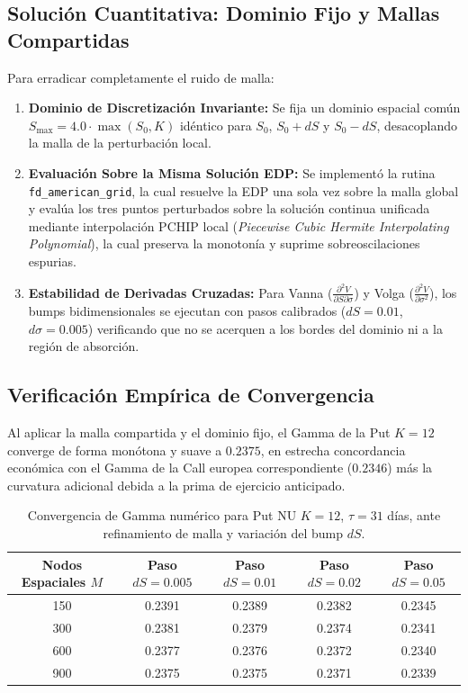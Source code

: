 \documentclass[11pt,a4paper]{article}
\begin{document}
\subsection{Solución Cuantitativa: Dominio Fijo y Mallas Compartidas}
Para erradicar completamente el ruido de malla:
\begin{enumerate}
    \item \textbf{Dominio de Discretización Invariante:} Se fija un dominio espacial común $S_{\max} = 4.0 \cdot \max(S_0, K)$ idéntico para $S_0$, $S_0 + dS$ y $S_0 - dS$, desacoplando la malla de la perturbación local.
    \item \textbf{Evaluación Sobre la Misma Solución EDP:} Se implementó la rutina \texttt{fd\_american\_grid}, la cual resuelve la EDP una sola vez sobre la malla global y evalúa los tres puntos perturbados sobre la solución continua unificada mediante interpolación PCHIP local (\textit{Piecewise Cubic Hermite Interpolating Polynomial}), la cual preserva la monotonía y suprime sobreoscilaciones espurias.
    \item \textbf{Estabilidad de Derivadas Cruzadas:} Para Vanna ($\frac{\partial^2 V}{\partial S \partial \sigma}$) y Volga ($\frac{\partial^2 V}{\partial \sigma^2}$), los bumps bidimensionales se ejecutan con pasos calibrados ($dS = 0.01$, $d\sigma = 0.005$) verificando que no se acerquen a los bordes del dominio ni a la región de absorción.
\end{enumerate}

\subsection{Verificación Empírica de Convergencia}
Al aplicar la malla compartida y el dominio fijo, el Gamma de la Put $K=12$ converge de forma monótona y suave a $0.2375$, en estrecha concordancia económica con el Gamma de la Call europea correspondiente ($0.2346$) más la curvatura adicional debida a la prima de ejercicio anticipado.
\begin{table}[htbp]
\centering
\begin{tabular}{ccccc}
\toprule
\textbf{Nodos Espaciales $M$} & \textbf{Paso $dS = 0.005$} & \textbf{Paso $dS = 0.01$} & \textbf{Paso $dS = 0.02$} & \textbf{Paso $dS = 0.05$} \\
\midrule
150 & 0.2391 & 0.2389 & 0.2382 & 0.2345 \\
300 & 0.2381 & 0.2379 & 0.2374 & 0.2341 \\
600 & 0.2377 & 0.2376 & 0.2372 & 0.2340 \\
900 & 0.2375 & 0.2375 & 0.2371 & 0.2339 \\
\bottomrule
\end{tabular}
\caption{Convergencia de Gamma numérico para Put NU $K=12$, $\tau=31$ días, ante refinamiento de malla y variación del bump $dS$.}
\end{table}
\end{document}
